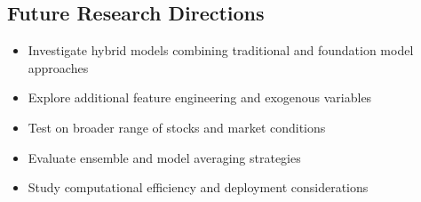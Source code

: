 \documentclass{article}
\begin{document}
\subsection{Future Research Directions}
\begin{itemize}
\item Investigate hybrid models combining traditional and foundation model approaches
\item Explore additional feature engineering and exogenous variables
\item Test on broader range of stocks and market conditions
\item Evaluate ensemble and model averaging strategies
\item Study computational efficiency and deployment considerations
\end{itemize}
\end{document}
